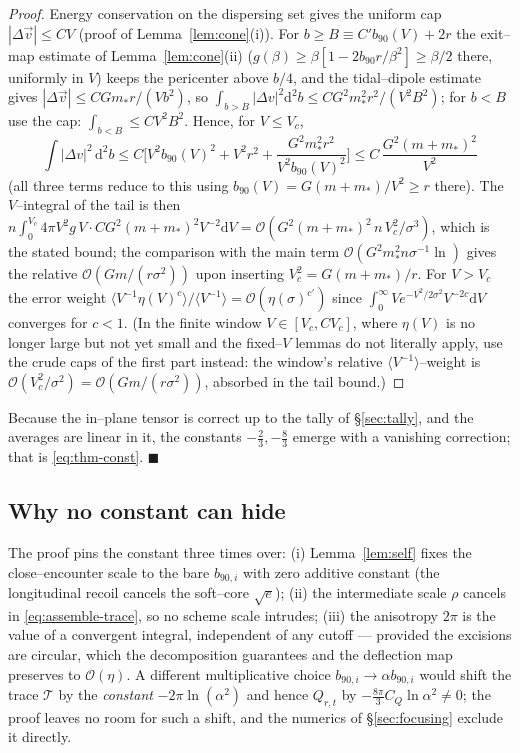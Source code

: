 \documentclass[11pt]{article}
\newcommand{\dd}{\mathrm{d}}
\newcommand{\bnt}{b_{90}}
\newcommand{\order}[1]{\mathcal O\!\left(#1\right)}
\begin{document}
\begin{proof}
Energy conservation on the dispersing set gives the uniform cap $|\Delta\vec v|\le C V$ (proof of
Lemma~\ref{lem:cone}(i)). For $b\ge B\equiv C'\bnt(V)+2r$ the exit--map estimate of
Lemma~\ref{lem:cone}(ii) ($g(\beta)\ge\beta[1-2b_{90}r/\beta^2]\ge\beta/2$ there, uniformly in
$V$) keeps the pericenter above $b/4$, and the tidal--dipole estimate gives
$|\Delta\vec v|\le CGm_*r/(Vb^2)$, so $\int_{b>B}|\Delta v|^2\dd^2b\le CG^2m_*^2r^2/(V^2B^2)$; for
$b<B$ use the cap: $\int_{b<B}\le CV^2B^2$. Hence, for $V\le V_c$,
\begin{equation*}
\int|\Delta v|^2\,\dd^2b\le C\Big[V^2\bnt(V)^2+V^2r^2+\frac{G^2m_*^2r^2}{V^2\bnt(V)^2}\Big]
\le C\,\frac{G^2(m+m_*)^2}{V^2}
\end{equation*}
(all three terms reduce to this using $\bnt(V)=G(m+m_*)/V^2\ge r$ there). The $V$--integral of the
tail is then
$n\int_0^{V_c}4\pi V^2g\,V\cdot CG^2(m+m_*)^2V^{-2}\dd V=\order{G^2(m+m_*)^2\,n\,V_c^2/\sigma^3}$,
which is the stated bound; the comparison with the main term
$\order{G^2m_*^2n\sigma^{-1}\ln}$ gives the relative $\order{Gm/(r\sigma^2)}$ upon inserting
$V_c^2=G(m+m_*)/r$. For $V>V_c$ the error weight
$\langle V^{-1}\eta(V)^{c}\rangle/\langle V^{-1}\rangle=\order{\eta(\sigma)^{c'}}$ since
$\int_0^\infty Ve^{-V^2/2\sigma^2}V^{-2c}\dd V$ converges for $c<1$. (In the finite window
$V\in[V_c,CV_c]$, where $\eta(V)$ is no longer large but not yet small and the fixed--$V$ lemmas
do not literally apply, use the crude caps of the first part instead: the window's relative
$\langle V^{-1}\rangle$--weight is $\order{V_c^2/\sigma^2}=\order{Gm/(r\sigma^2)}$, absorbed in
the tail bound.)
\end{proof}

Because the in--plane tensor is correct up to the tally of \S\ref{sec:tally}, and the averages are
linear in it, the constants $-\tfrac23,-\tfrac83$ emerge with a vanishing correction; that is
\eqref{eq:thm-const}. \hfill$\blacksquare$

\subsection{Why no constant can hide}
The proof pins the constant three times over: (i) Lemma~\ref{lem:self} fixes the close--encounter
scale to the bare $b_{90,i}$ with zero additive constant (the longitudinal recoil cancels the
soft--core $\sqrt e$); (ii) the intermediate scale $\rho$ cancels in \eqref{eq:assemble-trace}, so
no scheme scale intrudes; (iii) the anisotropy $2\pi$ is the value of a convergent integral,
independent of any cutoff --- provided the excisions are circular, which the decomposition
guarantees and the deflection map preserves to $\order\eta$. A different multiplicative choice
$b_{90,i}\to\alpha b_{90,i}$ would shift the trace $\mathcal T$ by the \emph{constant}
$-2\pi\ln(\alpha^2)$ and
hence $Q_{r,t}$ by $-\tfrac{8\pi}{3}C_Q\ln\alpha^2\ne0$; the proof leaves no room for such a shift,
and the numerics of \S\ref{sec:focusing} exclude it directly.
\end{document}
